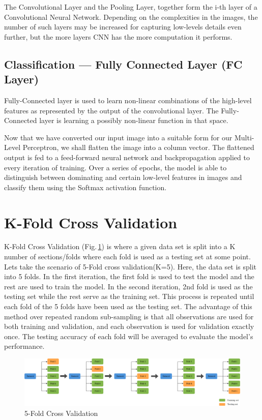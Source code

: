The Convolutional Layer and the Pooling Layer, together form the i-th layer of a Convolutional Neural Network. Depending on the complexities in the images, the number of such layers may be increased for capturing low-levels details even further, but the more layers CNN has the more computation it performs.

\subsection{Classification — Fully Connected Layer (FC Layer)}

Fully-Connected layer is used to learn non-linear combinations of the high-level features as represented by the output of the convolutional layer. The Fully-Connected layer is learning a possibly non-linear function in that space.

Now that we have converted our input image into a suitable form for our Multi-Level Perceptron, we shall flatten the image into a column vector. The flattened output is fed to a feed-forward neural network and backpropagation applied to every iteration of training. Over a series of epochs, the model is able to distinguish between dominating and certain low-level features in images and classify them using the Softmax activation function.

\section{K-Fold Cross Validation}
K-Fold Cross Validation \citep{Kohavi95astudy} (Fig.\,\ref{kfold}) is where a given data set is split into a K number of sections/folds where each fold is used as a testing set at some point. Lets take the scenario of 5-Fold cross validation(K=5). Here, the data set is split into 5 folds. In the first iteration, the first fold is used to test the model and the rest are used to train the model. In the second iteration, 2nd fold is used as the testing set while the rest serve as the training set. This process is repeated until each fold of the 5 folds have been used as the testing set. The advantage of this method over repeated random sub-sampling is that all observations are used for both training and validation, and each observation is used for validation exactly once. The testing accuracy of each fold will be averaged to evaluate the model's performance. 

\begin{figure}[h]
	\centering
	\includegraphics[width=\textwidth]{Figs/kfold.png}
    \caption{5-Fold Cross Validation}
    \label{kfold}
\end{figure}


